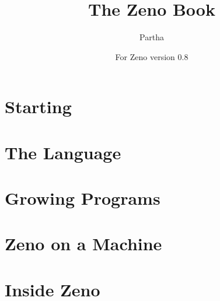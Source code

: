 \documentclass[11pt,a4paper,twoside,openany]{book}
\title{The Zeno Book}
\author{Partha}
\date{For Zeno version 0.8}
\begin{document}
\frontmatter
\zenotitlepage
\zenocopyright
\tableofcontents



\mainmatter

\part{Starting}




\part{The Language}













\part{Growing Programs}














\part{Zeno on a Machine}









\part{Inside Zeno}



\appendix
\begin{appendixstart}\end{appendixstart}







\end{document}
